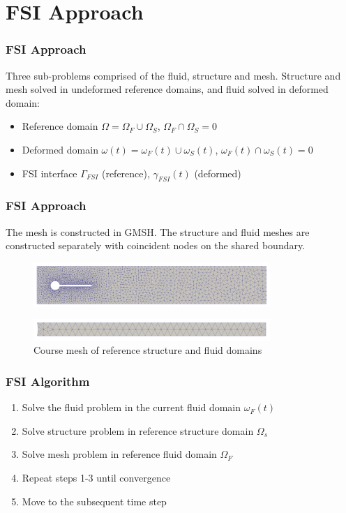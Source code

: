 \documentclass{beamer}
\begin{document}
\section{FSI Approach}
\begin{frame}
\frametitle{FSI Approach}
Three sub-problems comprised of the fluid, structure and mesh. Structure and mesh solved in undeformed reference domains, and fluid solved in deformed domain: 

\begin{itemize}
\item Reference domain $\Omega = \Omega_F \cup \Omega_S$, $\Omega_F \cap \Omega_S = 0$
\item Deformed domain $\omega(t) = \omega_F(t) \cup \omega_S(t)$, $\omega_F(t) \cap \omega_S(t) = 0$
\item FSI interface $\Gamma_{FSI}$ (reference), $\gamma_{FSI}(t)$ (deformed) 
\end{itemize}

\end{frame}

\begin{frame}
\frametitle{FSI Approach}
The mesh is constructed in GMSH. The structure and fluid meshes are constructed separately with coincident nodes on the shared boundary. 


\FloatBarrier
\begin{figure}[h]
\centering
	\includegraphics[width=0.8\textwidth]{mesh_fluid}
	\label{fig:mesh_fluid}
\end{figure}
\FloatBarrier

\FloatBarrier
\begin{figure}[h]
\centering
	\includegraphics[width=0.8\textwidth]{mesh_structure}
	\caption{Course mesh of reference structure and fluid domains}
	\label{fig:mesh_structure}
\end{figure}
\FloatBarrier



\end{frame}
\begin{frame}
\frametitle{FSI Algorithm}

\begin{enumerate}
\item Solve the fluid problem in the current fluid domain $\omega_F(t)$ 
\item Solve structure problem in reference structure domain $\Omega_s$
\item Solve mesh problem in reference fluid domain $\Omega_F$
\item Repeat steps 1-3 until convergence
\item Move to the subsequent time step
\end{enumerate} 

\end{frame}
\end{document}
